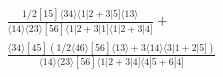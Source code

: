 \documentclass[varwidth, border=5pt]{standalone}
\begin{document}
\begin{my}
$\begin{gathered}
\scriptscriptstyle\frac{1/2[15]⟨34⟩⟨1|2+3|5]⟨13⟩}{⟨14⟩⟨23⟩[56]⟨1|2+3|1]⟨1|2+3|4]}+\\
\scriptscriptstyle\frac{⟨34⟩[45]\scriptscriptstyle(1/2⟨46⟩[56]⟨13⟩+3⟨14⟩⟨3|1+2|5])}{⟨14⟩⟨23⟩[56]⟨1|2+3|4]⟨4|5+6|4]}\phantom{+}
\end{gathered}$
\end{my}
\end{document}
